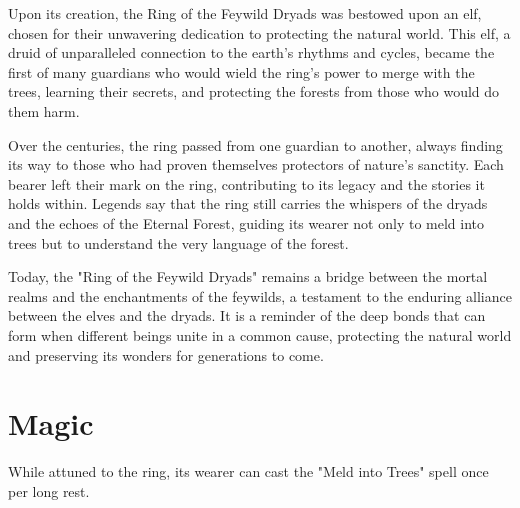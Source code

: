Upon its creation, the Ring of the Feywild Dryads was bestowed upon an elf, chosen for their unwavering dedication to protecting the natural world. This elf, a druid of unparalleled connection to the earth's rhythms and cycles, became the first of many guardians who would wield the ring's power to merge with the trees, learning their secrets, and protecting the forests from those who would do them harm.

Over the centuries, the ring passed from one guardian to another, always finding its way to those who had proven themselves protectors of nature's sanctity. Each bearer left their mark on the ring, contributing to its legacy and the stories it holds within. Legends say that the ring still carries the whispers of the dryads and the echoes of the Eternal Forest, guiding its wearer not only to meld into trees but to understand the very language of the forest.

Today, the "Ring of the Feywild Dryads" remains a bridge between the mortal realms and the enchantments of the feywilds, a testament to the enduring alliance between the elves and the dryads. It is a reminder of the deep bonds that can form when different beings unite in a common cause, protecting the natural world and preserving its wonders for generations to come.
\section*{Magic}
While attuned to the ring, its wearer can cast the "Meld into Trees" spell once per long rest.